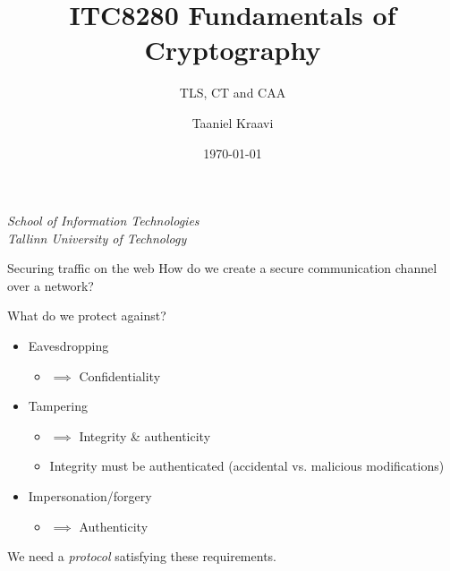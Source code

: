 \usepackage{tikz}
\usetikzlibrary{positioning,calc,external}

\title{ITC8280 Fundamentals of Cryptography}
\subtitle{TLS, CT and CAA}
\date{\today}
\author{Taaniel Kraavi}
\institute%
{%
  \textit{School of Information Technologies}\\
  \textit{Tallinn University of Technology}
}


\begin{frame}
  \titlepage
\end{frame}

\begin{frame}{Securing traffic on the web}
  How do we create a secure communication channel over a network?

  \vspace*{1em}

  \pause
  What do we protect against?
  \begin{itemize}[<+(1)->]
    \item Eavesdropping
    \begin{itemize}
      \item $\implies$ Confidentiality
    \end{itemize}
    \item Tampering
    \begin{itemize}
      \item $\implies$ Integrity \& authenticity
      \item Integrity must be authenticated (accidental vs. malicious modifications)
    \end{itemize}
    \item Impersonation/forgery
    \begin{itemize}
      \item $\implies$ Authenticity
    \end{itemize}
  \end{itemize}

  \vspace*{1em}

  \pause
  We need a \emph{protocol} satisfying these requirements.
\end{frame}

